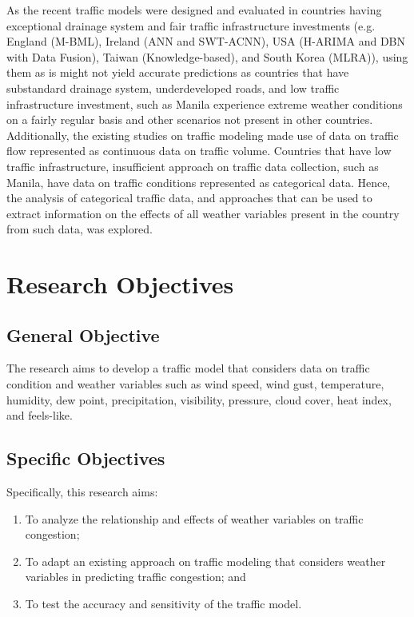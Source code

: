 As the recent traffic models were designed and evaluated in countries having exceptional drainage system and fair traffic infrastructure investments (e.g. England (M-BML), Ireland (ANN and SWT-ACNN), USA (H-ARIMA and DBN with Data Fusion), Taiwan (Knowledge-based), and South Korea (MLRA)), using them as is might not yield accurate predictions as countries that have substandard drainage system, underdeveloped roads, and low traffic infrastructure investment, such as Manila experience extreme weather conditions on a fairly regular basis and other scenarios not present in other countries. Additionally, the existing studies on traffic modeling made use of data on traffic flow represented as continuous data on traffic volume. Countries that have low traffic infrastructure, insufficient approach on traffic data collection, such as Manila, have data on traffic conditions represented as categorical data. Hence, the analysis of categorical traffic data, and approaches that can be used to extract information on the effects of all weather variables present in the country from such data, was explored.




\section{Research Objectives}
\label{sec:researchobjectives}

\subsection{General Objective}
\label{sec:generalobjective}

The research aims to develop a traffic model that considers data on traffic condition and weather variables such as wind speed, wind gust, temperature, humidity, dew point, precipitation, visibility, pressure, cloud cover, heat index, and feels-like.


\subsection{Specific Objectives}
\label{sec:specificobjectives}
Specifically, this research aims:
\begin{enumerate}
    \item To analyze the relationship and effects of weather variables on traffic congestion;
    \item To adapt an existing approach on traffic modeling that considers weather variables in predicting traffic congestion; and
    \item To test the accuracy and sensitivity of the traffic model.
\end{enumerate}


